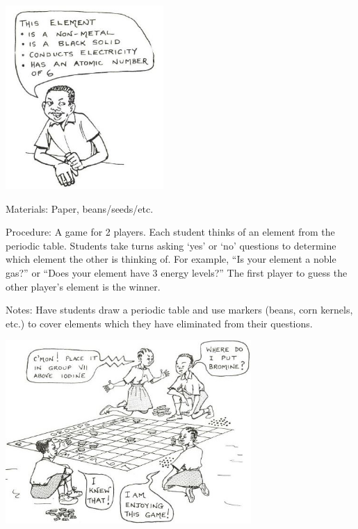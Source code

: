 \begin{multicols}{2}
\begin{center}
\includegraphics[width=0.45\textwidth]{./img/source/periodic-guess-who.jpg}
\end{center}

\begin{description*}
\item[Materials:]{Paper, beans/seeds/etc.}
\item[Procedure:]{A game for 2 players. Each student thinks of an element from the periodic table. Students take turns asking `yes' or `no' questions to determine which element the other is thinking of. For example, ``Is your element a noble gas?'' or ``Does your element have 3 energy levels?'' The first player to guess the other player's element is the winner.}
\item[Notes:]{Have students draw a periodic table and use markers (beans, corn kernels, etc.) to cover elements which they have eliminated from their questions.}
\end{description*}



\end{multicols}

\begin{center}
\includegraphics[width=0.7\textwidth]{./img/source/periodic-students.jpg}
\end{center}


\pagebreak